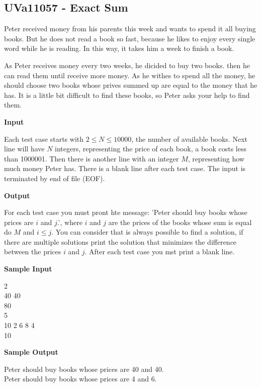 \subsection{UVa11057 -  Exact Sum}
Peter received money from his parents this week and wants to spend it all buying books. But he does not read a book so fast, because he likes to enjoy every single word while he is reading. In this way, it takes him a week to finish a book.

As Peter receives money every two weeks, he dicided to buy two books. then he can read them until receive more money. As he withes to spend all the money, he should choose two books whose prives summed up are equal to the money that he has. It is a little bit difficult to find these books, so Peter asks your help to find them.

\begin{flushleft}
{\color{red} \textbf{Input}}
\end{flushleft}
Each test case starts with $2 \leq N \leq 10000$, the number of available books. Next line will have $N$ integers, representing the price of each book, a book costs less than 1000001. Then there is another line with an integer $M$, representing how much money Peter has. There is a blank line after each test case. The input is terminated by end of file (EOF).

\begin{flushleft}
{\color{red} \textbf{Output}}
\end{flushleft}
For each test case you must pront hte message: 'Peter should buy books whose prices are $i$ and $j$.', where $i$ and $j$ are the prices of the books whose sum is equal do $M$ and $i \leq j$. You can consider that is always possible to find a solution, if there are multiple solutions print the solution that minimizes the difference between the prices $i$ and $j$. After each test case you mst print a blank line.

\begin{flushleft}
{\color{red} \textbf{Sample Input}}
\end{flushleft}
\begin{flushleft}
2\\
40 40\\
80\\
5\\
10 2 6 8 4\\
10\\
\end{flushleft}

\begin{flushleft}
{\color{red} \textbf{Sample Output}}
\end{flushleft}
\begin{flushleft}
Peter should buy books whose prices are 40 and 40.\\
\bigskip
Peter should buy books whose prices are 4 and 6.\\
\bigskip
\end{flushleft}

\newpage